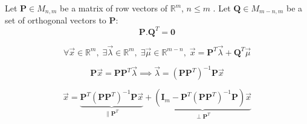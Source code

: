 \documentclass[aps,12pt]{revtex4}
\begin{document}
Let $\bm{P} \in M_{n,m}$ be a matrix of row vectors of $\mathbb{R}^m$, $n\leq m$ .
Let $\bm{Q} \in M_{m-n,m}$ be a set of orthogonal vectors to $\bm{P}$:
\begin{equation}
	\bm{P}.\bm{Q}^T = \bm{0}
\end{equation} 
 
\begin{equation}
\forall \vec x \in \mathbb{R}^m, \; \exists \vec \lambda \in \mathbb{R}^m, \; \exists \vec \mu \in \mathbb{R}^{m-n}, \;
\vec{x} = \bm{P}^T \vec \lambda + \bm{Q}^T \vec \mu
\end{equation} 
 
\begin{equation}
	\bm{P} \vec{x} = \bm{P}\bm{P}^T \vec \lambda \implies \vec \lambda = \left(\bm{P}\bm{P}^T\right)^{-1} \bm{P} \vec{x}
\end{equation}

\begin{equation}
	 	\vec{x} = 
		\underbrace{\bm{P}^T \left(\bm{P}\bm{P}^T\right)^{-1} \bm{P} \vec{x}}_{\parallel \bm{P}^T}
		+ \underbrace{\left( \bm{I}_m - \bm{P}^T \left(\bm{P}\bm{P}^T\right)^{-1} \bm{P}\right) \vec{x}}_{\perp \bm{P}^T}
\end{equation}
\end{document}
